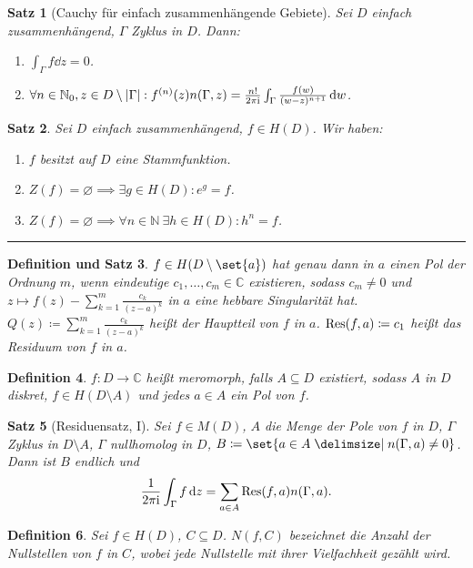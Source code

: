 \documentclass[a4paper]{article}
\newcounter{Sec}
\theoremstyle{marginbreak}
\newtheorem{definition}{Definition}[Sec]
\newtheorem{satz}[definition]{Satz}
\newtheorem{defsatz}[definition]{Definition und Satz}
\newcommand{\sep}{%
	\rule{\textwidth}{0.3pt}%
	\stepcounter{Sec}%
	}
\newcommand{\C}{\mathbb{C}}
\renewcommand{\i}{\mathrm{i}}
\begin{document}
	\begin{satz}[Cauchy für einfach zusammenhängende Gebiete]
		Sei $D$ einfach zusammenhängend, $\Gamma$ Zyklus in $D$. Dann:
		\begin{enumerate}[label=(\alph*)]
			\item $\int_\Gamma f\dd{z}=0$.
			\item $\forall n\in\mathbb{N}_0, z\in D\setminus\abs{\Gamma}:f^{(n)}(z)n(\Gamma, z)=\frac{n!}{2\pi\i}\int_\Gamma\frac{f(w)}{(w-z)^{n+1}}\dd{w}$.
		\end{enumerate}
	\end{satz}
	\begin{satz}
		Sei $D$ einfach zusammenhängend, $f\in H(D)$. Wir haben:
		\begin{enumerate}[label=(\alph*)]
			\item $f$ besitzt auf $D$ eine Stammfunktion.
			\item $Z(f)=\varnothing\implies\exists g\in H(D): e^g=f$.
			\item $Z(f)=\varnothing\implies\forall n\in\mathbb{N}~\exists h\in H(D): h^n=f$.
		\end{enumerate}
	\end{satz}
	\sep
	\begin{defsatz}
		$f\in H(D\setminus\set{a})$ hat genau dann in $a$ einen Pol der Ordnung $m$, wenn eindeutige $c_1,\ldots,c_m\in\C$
		existieren, sodass $c_m\neq 0$ und $z\mapsto f(z)-\sum_{k=1}^m\frac{c_k}{(z-a)^k}$ in $a$ eine hebbare Singularität hat.
		$Q(z)\coloneqq\sum_{k=1}^m\frac{c_k}{(z-a)^k}$ heißt der Hauptteil von $f$ in $a$. $\Res(f, a)\coloneqq c_1$ heißt das
		Residuum von $f$ in $a$.
	\end{defsatz}
	\begin{definition}
		$f\colon D\to\C$ heißt meromorph, falls $A\subseteq D$ existiert, sodass $A$ in
		$D$ diskret, $f\in H(D\setminus A)$ und jedes $a\in A$ ein Pol von $f$.
	\end{definition}
	\begin{satz}[Residuensatz, I]
		Sei $f\in M(D)$, $A$ die Menge der Pole von $f$ in $D$, $\Gamma$ Zyklus in $D\setminus A$,
		$\Gamma$ nullhomolog in $D$, $B\coloneqq\set{a\in A\given n(\Gamma, a)\neq 0}$. Dann ist $B$ endlich
		und
		\[
			\frac{1}{2\pi\i}\int_\Gamma f\dd{z}=\sum_{a\in A}\Res(f, a)n(\Gamma, a).
		\]
	\end{satz}
	\begin{definition}
		Sei $f\in H(D)$, $C\subseteq D$. $N(f, C)$ bezeichnet die Anzahl der Nullstellen
		von $f$ in $C$, wobei jede Nullstelle mit ihrer Vielfachheit gezählt wird.
	\end{definition}
\end{document}
